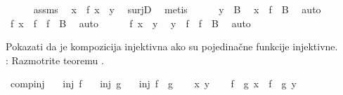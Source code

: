 \begin{isabellebody}
\begin{exercise}[subtitle=Svojstva funkcija]
\ \ \ \ \isamarkupfalse%
\ assms\ \isamarkupfalse%
\ x\ \ {\isachardoublequoteopen}f\ x\ {\isacharequal}{\kern0pt}\ y{\isachardoublequoteclose}\ \isamarkupfalse%
\ surjD\ \isamarkupfalse%
\ metis\isanewline
\ \ \ \ \isamarkupfalse%
\ {\isacartoucheopen}y\ {\isasymin}\ B{\isacartoucheclose}\ \isamarkupfalse%
\ {\isachardoublequoteopen}x\ {\isasymin}\ f\ {\isacharminus}{\kern0pt}{\isacharbackquote}{\kern0pt}\ B{\isachardoublequoteclose}\ \isamarkupfalse%
\ auto\isanewline
\ \ \ \ \isamarkupfalse%
\ \isamarkupfalse%
\ {\isachardoublequoteopen}f\ x\ {\isasymin}\ f\ {\isacharbackquote}{\kern0pt}\ {\isacharparenleft}{\kern0pt}f\ {\isacharminus}{\kern0pt}{\isacharbackquote}{\kern0pt}\ B{\isacharparenright}{\kern0pt}{\isachardoublequoteclose}\ \isamarkupfalse%
\ auto\isanewline
\ \ \ \ \isamarkupfalse%
\ {\isacartoucheopen}f\ x\ {\isacharequal}{\kern0pt}\ y{\isacartoucheclose}\ \isamarkupfalse%
\ {\isachardoublequoteopen}y\ {\isasymin}\ f\ {\isacharbackquote}{\kern0pt}\ f\ {\isacharminus}{\kern0pt}{\isacharbackquote}{\kern0pt}\ B{\isachardoublequoteclose}\ \isamarkupfalse%
\ auto\isanewline
\ \ \isamarkupfalse%
\isanewline
{}\isamarkupfalse%
%
\endisatagproof
{\isafoldproof}%
%
\isadelimproof
%
\endisadelimproof
%
\begin{isamarkuptext}%
Pokazati da je kompozicija injektivna 
      ako su pojedinačne funkcije injektivne.\\
      : Razmotrite teoremu .%
\end{isamarkuptext}\isamarkuptrue%
\isamarkupfalse%
\ comp{\isacharunderscore}{\kern0pt}inj{\isacharcolon}{\kern0pt}\isanewline
\ \ \ {\isachardoublequoteopen}inj\ f{\isachardoublequoteclose}\isanewline
\ \ \ {\isachardoublequoteopen}inj\ g{\isachardoublequoteclose}\isanewline
\ \ \ {\isachardoublequoteopen}inj\ {\isacharparenleft}{\kern0pt}f\ {\isasymcirc}\ g{\isacharparenright}{\kern0pt}{\isachardoublequoteclose}\isanewline
%
\isadelimproof
%
\endisadelimproof
%
\isatagproof
{}\isamarkupfalse%
\isanewline
\ \ \isamarkupfalse%
\ x\ y\isanewline
\ \ \isamarkupfalse%
\ {\isachardoublequoteopen}{\isacharparenleft}{\kern0pt}f\ {\isasymcirc}\ g{\isacharparenright}{\kern0pt}\ x\ {\isacharequal}{\kern0pt}\ {\isacharparenleft}{\kern0pt}f\ {\isasymcirc}\ g{\isacharparenright}{\kern0pt}\ y{\isachardoublequoteclose}\isanewline

\end{exercise}
\end{isabellebody}

